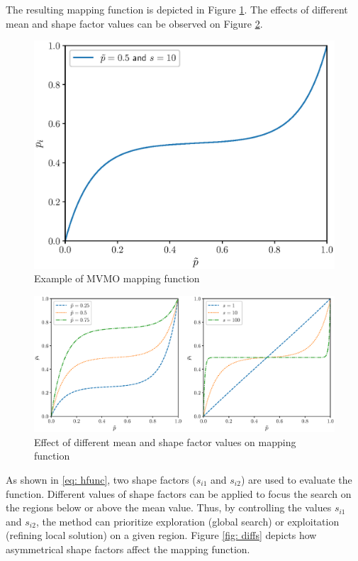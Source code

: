 The resulting mapping function is depicted in Figure \ref{fig: mappingf}. The effects of different mean and shape factor values can be observed on Figure \ref{fig: mapeffects}.

\begin{figure}[!h]
	\caption{Example of MVMO mapping function}
	\begin{center}
		\includegraphics[scale=.7]{Images/MVMOTransformation.eps}
	\end{center}
	\label{fig: mappingf}
\end{figure}

\begin{figure}[h]
	\caption{Effect of different mean and shape factor values on mapping function}
	\begin{center}
		\includegraphics[scale=.55]{Images/mean_var_effects.eps}
	\end{center}
	\label{fig: mapeffects}
\end{figure}

As shown in \eqref{eq: hfunc}, two shape factors ($s_{i1}$ and $s_{i2}$) are used to evaluate the function. Different values of shape factors can be applied to focus the search on the regions below or above the mean value. Thus, by controlling the values $s_{i1}$ and $s_{i2}$, the method can prioritize exploration (global search) or exploitation (refining local solution) on a given region. Figure \ref{fig: diffs} depicts how asymmetrical shape factors affect the mapping function.

